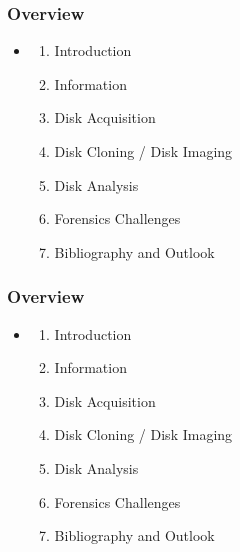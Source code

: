 \documentclass{beamer}
\begin{document}
\begin{frame}
  \frametitle{Overview}
  \begin{itemize}
  \item[]
      \begin{enumerate}
          \item Introduction
          \item Information
          \item Disk Acquisition
          \item Disk Cloning / Disk Imaging
          \item Disk Analysis
          \item Forensics Challenges
          \item Bibliography and Outlook
      \end{enumerate}
  \end{itemize}
\end{frame}










\begin{frame}
  \frametitle{Overview}
  \begin{itemize}
  \item[]
      \begin{enumerate}
          \item Introduction
          \item Information
          \item Disk Acquisition
          \item Disk Cloning / Disk Imaging
          \item Disk Analysis
          \item Forensics Challenges
          \item Bibliography and Outlook
      \end{enumerate}
  \end{itemize}
\end{frame}
\end{document}
